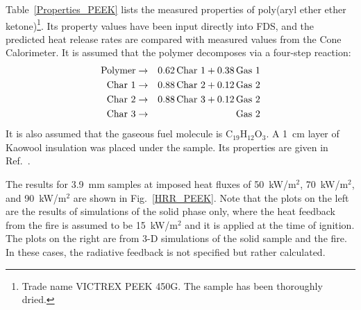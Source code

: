 Table~\ref{Properties_PEEK} lists the measured properties of poly(aryl ether ether ketone)\footnote{Trade name VICTREX PEEK 450G. The sample has been thoroughly dried.}. Its property values have been input directly into FDS, and the predicted heat release rates are compared with measured values from the Cone Calorimeter. It is assumed that the polymer decomposes via a four-step reaction:
\begin{eqnarray}
   \hbox{Polymer} &\to& 0.62 \, \hbox{Char 1} + 0.38 \, \hbox{Gas 1}  \\
   \hbox{Char 1}  &\to& 0.88 \, \hbox{Char 2} + 0.12 \, \hbox{Gas 2}  \\
   \hbox{Char 2}  &\to& 0.88 \, \hbox{Char 3} + 0.12 \, \hbox{Gas 2}  \\
   \hbox{Char 3}  &\to& \hbox{Gas 2}
\end{eqnarray}
It is also assumed that the gaseous fuel molecule is C$_{19}$H$_{12}$O$_3$. A 1~cm layer of Kaowool insulation was placed under the sample. Its properties are given in Ref.~\cite{Stoliarov:CF2010}.

The results for 3.9~mm samples at imposed heat fluxes of 50~kW/m$^2$, 70~kW/m$^2$, and 90~kW/m$^2$ are shown in Fig.~\ref{HRR_PEEK}. Note that the plots on the left are the results of simulations of the solid phase only, where the heat feedback from the fire is assumed to be 15~kW/m$^2$ and it is applied at the time of ignition. The plots on the right are from 3-D simulations of the solid sample and the fire. In these cases, the radiative feedback is not specified but rather calculated.

